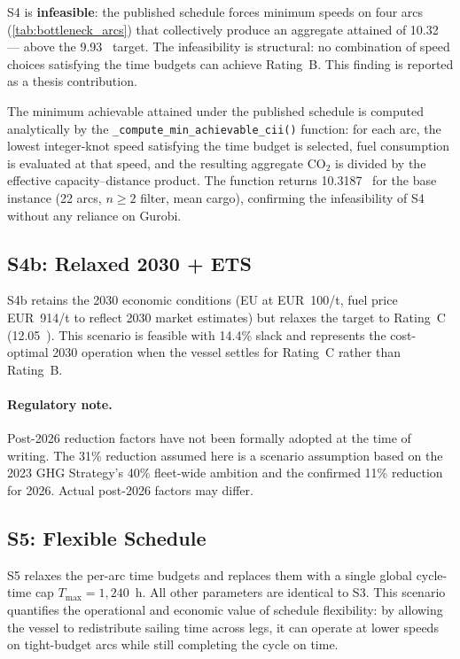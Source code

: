 S4 is \textbf{infeasible}: the published schedule forces minimum
speeds on four arcs (\cref{tab:bottleneck_arcs}) that collectively
produce an aggregate attained \CII{} of 10.32~\gGTnm{} --- above
the 9.93~\gGTnm{} target. The infeasibility is structural: no
combination of speed choices satisfying the time budgets can achieve
Rating~B. This finding is reported as a thesis contribution.

The minimum achievable attained \CII{} under the published schedule is
computed analytically by the \texttt{\_compute\_min\_achievable\_cii()}
function: for each arc, the lowest integer-knot speed satisfying the time
budget is selected, fuel consumption is evaluated at that speed, and the
resulting aggregate CO$_2$ is divided by the effective capacity--distance
product.  The function returns 10.3187~\gGTnm{} for the base instance
(22 arcs, $n \geq 2$ filter, mean cargo), confirming the infeasibility
of S4 without any reliance on Gurobi.

\subsection{S4b: Relaxed 2030 + ETS}
\label{sec:scen:s4b}

S4b retains the 2030 economic conditions (EU \ETS{} at EUR~100/t,
fuel price EUR~914/t to reflect 2030 market estimates) but relaxes the
\CII{} target to Rating~C (12.05~\gGTnm{}). This scenario is feasible
with 14.4\% slack and represents the cost-optimal 2030 operation
when the vessel settles for Rating~C rather than Rating~B.

\paragraph{Regulatory note.}
Post-2026 reduction factors have not been formally adopted at the time
of writing. The 31\% reduction assumed here is a scenario assumption
based on the \IMO{} 2023 GHG Strategy's 40\% fleet-wide ambition
\parencite{mepc377} and the confirmed 11\% reduction for 2026.
Actual post-2026 factors may differ.

\subsection{S5: Flexible Schedule}
\label{sec:scen:s5}

S5 relaxes the per-arc time budgets and replaces them with a single
global cycle-time cap $T_{\max} = 1{,}240$~h. All other parameters
are identical to S3. This scenario quantifies the operational and
economic value of schedule flexibility: by allowing the vessel to
redistribute sailing time across legs, it can operate at lower speeds
on tight-budget arcs while still completing the cycle on time.

